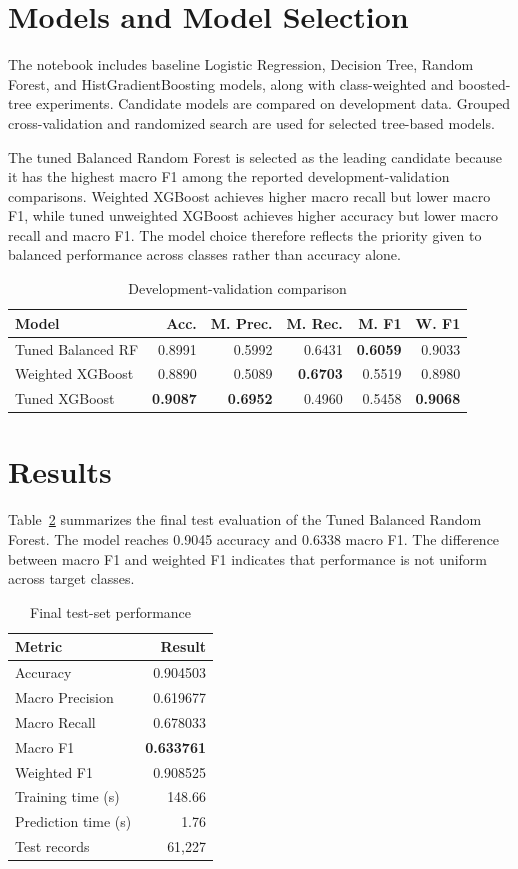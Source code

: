 \documentclass[conference]{IEEEtran}
\begin{document}
\section{Models and Model Selection}
The notebook includes baseline Logistic Regression, Decision Tree, Random Forest, and HistGradientBoosting models, along with class-weighted and boosted-tree experiments. Candidate models are compared on development data. Grouped cross-validation and randomized search are used for selected tree-based models.

The tuned Balanced Random Forest is selected as the leading candidate because it has the highest macro F1 among the reported development-validation comparisons. Weighted XGBoost achieves higher macro recall but lower macro F1, while tuned unweighted XGBoost achieves higher accuracy but lower macro recall and macro F1. The model choice therefore reflects the priority given to balanced performance across classes rather than accuracy alone.

\begin{table}[t]
\caption{Development-validation comparison}
\label{tab:validation}
\centering
\footnotesize
\begin{tabular}{lrrrrr}
\toprule
Model & Acc. & M. Prec. & M. Rec. & M. F1 & W. F1\\
\midrule
Tuned Balanced RF & 0.8991 & 0.5992 & 0.6431 & \textbf{0.6059} & 0.9033\\
Weighted XGBoost & 0.8890 & 0.5089 & \textbf{0.6703} & 0.5519 & 0.8980\\
Tuned XGBoost & \textbf{0.9087} & \textbf{0.6952} & 0.4960 & 0.5458 & \textbf{0.9068}\\
\bottomrule
\end{tabular}
\end{table}

\section{Results}
Table~\ref{tab:testmetrics} summarizes the final test evaluation of the Tuned Balanced Random Forest. The model reaches 0.9045 accuracy and 0.6338 macro F1. The difference between macro F1 and weighted F1 indicates that performance is not uniform across target classes.

\begin{table}[t]
\caption{Final test-set performance}
\label{tab:testmetrics}
\centering
\begin{tabular}{lr}
\toprule
Metric & Result\\
\midrule
Accuracy & 0.904503\\
Macro Precision & 0.619677\\
Macro Recall & 0.678033\\
Macro F1 & \textbf{0.633761}\\
Weighted F1 & 0.908525\\
Training time (s) & 148.66\\
Prediction time (s) & 1.76\\
Test records & 61,227\\
\bottomrule
\end{tabular}
\end{table}
\end{document}
